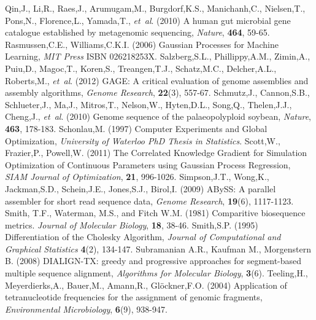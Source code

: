 \begin{thebibliography}{}
 Qin,J., Li,R., Raes,J., Arumugam,M., Burgdorf,K.S., Manichanh,C., Nielsen,T., Pons,N., Florence,L., Yamada,T., {\it et~al}. (2010) A human gut microbial gene catalogue established by metagenomic sequencing, {\it Nature}, {\bf 464}, 59-65.
 Rasmussen,C.E., Williams,C.K.I. (2006) Gaussian Processes for Machine Learning, {\it MIT Press} ISBN 026218253X.
 Salzberg,S.L., Phillippy,A.M., Zimin,A., Puiu,D., Magoc,T., Koren,S., Treangen,T.J., Schatz,M.C., Delcher,A.L., Roberts,M., {\it et~al}. (2012)  GAGE: A critical evaluation of genome assemblies and assembly algorithms, {\it Genome Research}, {\bf 22}(3), 557-67.
 Schmutz,J., Cannon,S.B., Schlueter,J., Ma,J., Mitros,T., Nelson,W., Hyten,D.L., Song,Q., Thelen,J.J., Cheng,J., {\it et~al}. (2010) Genome sequence of the palaeopolyploid soybean, {\it Nature}, {\bf 463}, 178-183.
 Schonlau,M. (1997) Computer Experiments and Global Optimization, {\it University of Waterloo PhD Thesis in Statistics}.
 Scott,W., Frazier,P., Powell,W. (2011) The Correlated Knowledge Gradient for Simulation Optimization of Continuous Parameters using Gaussian Process Regression, {\it SIAM Journal of Optimization}, {\bf 21}, 996-1026.
 Simpson,J.T., Wong,K., Jackman,S.D., Schein,J.E., Jones,S.J., Birol,I. (2009) ABySS: A parallel assembler for short read sequence data, {\it Genome Research}, {\bf 19}(6), 1117-1123.
Smith, T.F., Waterman, M.S., and Fitch W.M. (1981) Comparitive biosequence metrics. \textit{Journal of Molecular Biology}, \textbf{18}, 38-46.
 Smith,S.P. (1995) Differentiation of the Cholesky Algorithm, {\it Journal of Computational and Graphical Statistics} {\bf 4}(2), 134-147.
Subramanian A.R., Kaufman M., Morgenstern B. (2008) DIALIGN-TX: greedy and progressive approaches for segment-based multiple sequence alignment, {\it Algorithms for Molecular Biology}, {\bf 3}(6).
 Teeling,H., Meyerdierks,A., Bauer,M., Amann,R., Glöckner,F.O. (2004) Application of tetranucleotide frequencies for the assignment of genomic fragments, {\it Environmental Microbiology}, {\bf 6}(9), 938-947.

\end{thebibliography}

